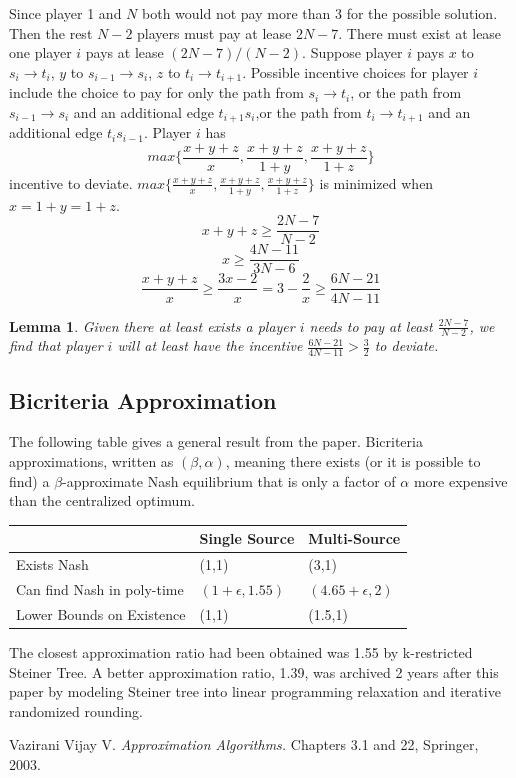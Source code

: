 \documentclass[11pt,psfig,times]{article}
\newtheorem{lemma}{Lemma}[section]
\begin{document}
	Since player 1 and $N$ both would not pay more than 3 for the possible solution. Then the rest $N-2$ players must pay at lease $2N-7$. There must exist at lease one player $i$ pays at lease $(2N-7)/(N-2)$. Suppose player $i$ pays $x$ to $s_i \rightarrow t_i$, $y$ to $s_{i-1} \rightarrow s_i$, $z$ to $t_i \rightarrow t_{i+1}$. Possible incentive choices for player $i$ include the choice to pay for only the path from $s_i \rightarrow t_i$, or the path from $s_{i-1} \rightarrow s_i$ and an additional edge $t_{i+1}s_i$,or the path from $t_i \rightarrow t_{i+1}$ and an additional edge $t_is_{i-1}$. Player $i$ has \[max\{\frac{x+y+z}{x},\frac{x+y+z}{1+y},\frac{x+y+z}{1+z}\}\] incentive to deviate. 
	$max\{\frac{x+y+z}{x},\frac{x+y+z}{1+y},\frac{x+y+z}{1+z}\}$ is minimized when $x = 1+y =1+z$. 
		\[x+y+z \geq \frac{2N-7}{N-2}\]
		\[x \geq \frac{4N-11}{3N-6}\]
		\[\frac{x+y+z}{x} \geq \frac{3x-2}{x} = 3-\frac{2}{x} \geq \frac{6N-21}{4N-11} \]
	
		\begin{lemma}
			Given there at least exists a player $i$ needs to pay at least $\frac{2N-7}{N-2}$, we find that player $i$ will at least have the incentive $\frac{6N-21}{4N-11} > \frac{3}{2}$ to deviate.
		\end{lemma}
	
	\subsection{Bicriteria Approximation}
	The following table gives a general result from the paper. Bicriteria approximations, written as $(\beta,\alpha)$, meaning there exists (or it is possible to find) a $\beta$-approximate Nash equilibrium that is only a factor of $\alpha$ more expensive than the centralized optimum.
	\begin{center}
			\begin{tabular} { 
				| m{5cm} | m{3cm}| m{3cm} | }
			   \hline
				& Single Source & Multi-Source\\
			   \hline
			   Exists Nash  & (1,1)  &  (3,1)\\
			  \hline
			  Can find Nash in poly-time & $(1+\epsilon,1.55)$ & $(4.65+\epsilon,2)$\\
			  \hline
			  Lower Bounds on Existence & (1,1) & (1.5,1)\\
			  \hline
			  \end{tabular}
	\end{center}

	The closest approximation ratio had been obtained was 1.55 by k-restricted Steiner Tree. A better approximation ratio, 1.39, was archived 2 years after this paper by modeling Steiner tree into linear programming relaxation and iterative randomized rounding.
	

\begin{thebibliography}{10}
	\setlength{\itemsep}{0pt plus .3pt}
	\setlength{\parsep}{0pt plus .3pt}
	\setlength{\parskip}{0pt plus .3pt}
Vazirani Vijay V. {\em Approximation Algorithms.\/} Chapters 3.1 and 22, Springer, 2003.
\end{thebibliography}
\end{document}
